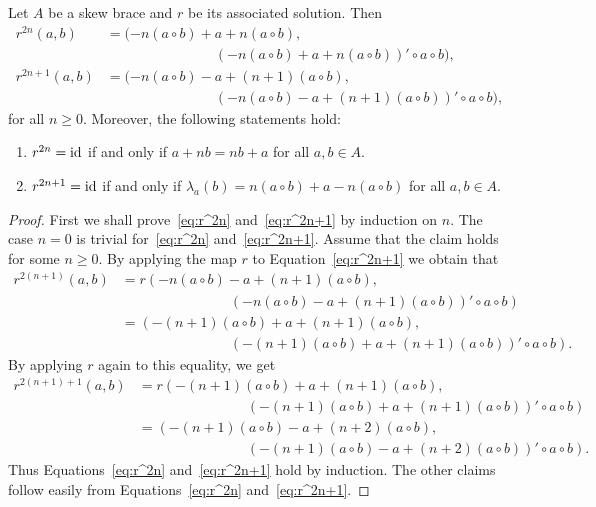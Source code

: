 \begin{lemma}
\label{lem:|r|}
Let $A$ be a skew brace and $r$ be its associated solution.  Then
  \begin{align} 
  \nonumber
  r^{2n}(a,b)&=(-n(a\circ b)+a+n(a\circ
    b),\\
    \label{eq:r^2n}
    &\phantom{=(-n(a\circ b)+}(-n(a\circ b)+a+n(a\circ b))'\circ a\circ b),\\
  \nonumber
  r^{2n+1}(a,b)&=(-n(a\circ b)-a+(n+1)(a\circ
    b),\\
    \label{eq:r^2n+1}
    &\phantom{=(-n(a\circ b)+}(-n(a\circ b)-a+(n+1)(a\circ b))'\circ a\circ b),
    \end{align} 
    for all $n\geq0$.  Moreover, the following statements hold:
  \begin{enumerate} 
  \item $r^{2n}=\operatorname{id}$ if and only if $a+nb=nb+a$ for all $a,b\in A$.  
      \item $r^{2n+1}=\operatorname{id}$ if and only if $\lambda_a(b)=n(a\circ
	b)+a-n(a\circ b)$ for all $a,b\in A$.  
	\end{enumerate} 
\end{lemma}

\begin{proof} 
First we shall prove~\eqref{eq:r^2n} and~\eqref{eq:r^2n+1} by induction on $n$. The case $n=0$ is trivial for~\eqref{eq:r^2n}
  and~\eqref{eq:r^2n+1}. Assume that the claim holds for some $n\geq 0$. By applying the map $r$ to Equation~\eqref{eq:r^2n+1} 
  we obtain that 
  \begin{align*} 
  r^{2(n+1)}(a,b) &=r\left( -n(a\circ b)-a+(n+1)(a\circ b),\right.\\
    &\phantom{=(-n(a\circ b)+} \left. (-n(a\circ b)-a+(n+1)(a\circ
    b))'\circ a\circ b\right)\\
    &=\left( -(n+1)(a\circ b)+a+(n+1)(a\circ b),\right.\\
    &\phantom{=(-n(a\circ b)+} \left. (-(n+1)(a\circ b)+a+(n+1)(a\circ
    b))'\circ a\circ b\right).
    \end{align*} 
    By applying $r$ again to this equality, we get 
    \begin{align*} 
  r^{2(n+1)+1}(a,b) &= r\left(-(n+1)(a\circ b)+a+(n+1)(a\circ
    b),\right.\\
    &\phantom{=(-n(a\circ b)+} \left. (-(n+1)(a\circ b)+a+(n+1)(a\circ b))'\circ a\circ b\right)\\
    &=\left( -(n+1)(a\circ b)-a+(n+2)(a\circ b),\right.\\
    &\phantom{=(-n(a\circ b)+} \left. (-(n+1)(a\circ b)-a+(n+2)(a\circ
    b))'\circ a\circ b\right).
    \end{align*} 
   Thus Equations~\eqref{eq:r^2n} and~\eqref{eq:r^2n+1} hold by induction.  The other claims follow easily from
    Equations~\eqref{eq:r^2n} and~\eqref{eq:r^2n+1}.
\end{proof}

